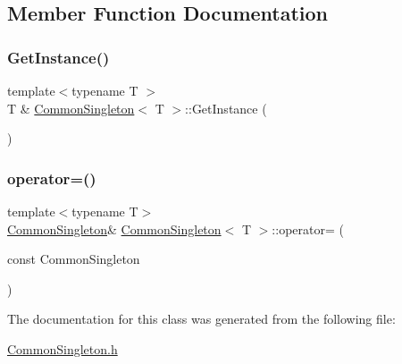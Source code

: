 \subsection{Member Function Documentation}
\mbox{\label{class_common_singleton_a77cfefba5f8a8a3302851c40bfc51e38}} 
\subsubsection{\texorpdfstring{GetInstance()}{GetInstance()}}
{\footnotesize\ttfamily template$<$typename T $>$ \\
T \& \mbox{\hyperlink{class_common_singleton}{Common\+Singleton}}$<$ T $>$\+::Get\+Instance (\begin{DoxyParamCaption}{ }\end{DoxyParamCaption})\hspace{0.3cm}{\ttfamily [static]}}

\mbox{\label{class_common_singleton_a4f30b3cc1365df03a07b04cb4095d6f0}} 
\subsubsection{\texorpdfstring{operator=()}{operator=()}}
{\footnotesize\ttfamily template$<$typename T$>$ \\
\mbox{\hyperlink{class_common_singleton}{Common\+Singleton}}\& \mbox{\hyperlink{class_common_singleton}{Common\+Singleton}}$<$ T $>$\+::operator= (\begin{DoxyParamCaption}\item[{const}]{Common\+Singleton }\end{DoxyParamCaption})\hspace{0.3cm}{\ttfamily [delete]}}



The documentation for this class was generated from the following file\+:\begin{DoxyCompactItemize}
\item 
\mbox{\hyperlink{_common_singleton_8h}{Common\+Singleton.\+h}}\end{DoxyCompactItemize}
